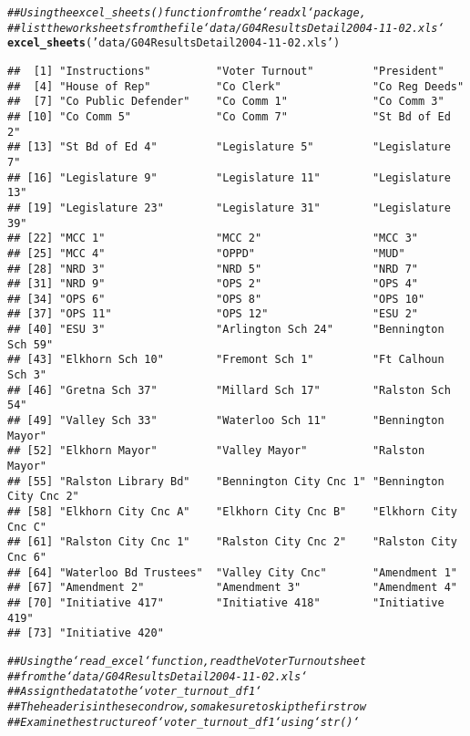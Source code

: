 \documentclass{article}\usepackage[]{graphicx}\usepackage[]{xcolor}
\makeatletter
\newcommand{\hlstr}[1]{\textcolor[rgb]{0.192,0.494,0.8}{#1}}%
\newcommand{\hlcom}[1]{\textcolor[rgb]{0.678,0.584,0.686}{\textit{#1}}}%
\newcommand{\hlstd}[1]{\textcolor[rgb]{0.345,0.345,0.345}{#1}}%
\newcommand{\hlkwd}[1]{\textcolor[rgb]{0.737,0.353,0.396}{\textbf{#1}}}%
\newenvironment{kframe}{%
 \def\at@end@of@kframe{}%
 \ifinner\ifhmode%
  \def\at@end@of@kframe{\end{minipage}}%
  \begin{minipage}{\columnwidth}%
 \fi\fi%
 \def\FrameCommand##1{\hskip\@totalleftmargin \hskip-\fboxsep
 \colorbox{shadecolor}{##1}\hskip-\fboxsep
     \hskip-\linewidth \hskip-\@totalleftmargin \hskip\columnwidth}%
 \MakeFramed {\advance\hsize-\width
   \@totalleftmargin\z@ \linewidth\hsize
   \@setminipage}}%
 {\par\unskip\endMakeFramed%
 \at@end@of@kframe}
\newenvironment{knitrout}{}{} %
\makeatother
\begin{document}
\begin{knitrout}
\begin{kframe}
\begin{alltt}
\hlcom{## Using the excel_sheets() function from the `readxl` package,}
\hlcom{## list the worksheets from the file `data/G04ResultsDetail2004-11-02.xls`}
\hlkwd{excel_sheets}\hlstd{(}\hlstr{'data/G04ResultsDetail2004-11-02.xls'}\hlstd{)}
\end{alltt}
\begin{verbatim}
##  [1] "Instructions"          "Voter Turnout"         "President"            
##  [4] "House of Rep"          "Co Clerk"              "Co Reg Deeds"         
##  [7] "Co Public Defender"    "Co Comm 1"             "Co Comm 3"            
## [10] "Co Comm 5"             "Co Comm 7"             "St Bd of Ed 2"        
## [13] "St Bd of Ed 4"         "Legislature 5"         "Legislature 7"        
## [16] "Legislature 9"         "Legislature 11"        "Legislature 13"       
## [19] "Legislature 23"        "Legislature 31"        "Legislature 39"       
## [22] "MCC 1"                 "MCC 2"                 "MCC 3"                
## [25] "MCC 4"                 "OPPD"                  "MUD"                  
## [28] "NRD 3"                 "NRD 5"                 "NRD 7"                
## [31] "NRD 9"                 "OPS 2"                 "OPS 4"                
## [34] "OPS 6"                 "OPS 8"                 "OPS 10"               
## [37] "OPS 11"                "OPS 12"                "ESU 2"                
## [40] "ESU 3"                 "Arlington Sch 24"      "Bennington Sch 59"    
## [43] "Elkhorn Sch 10"        "Fremont Sch 1"         "Ft Calhoun Sch 3"     
## [46] "Gretna Sch 37"         "Millard Sch 17"        "Ralston Sch 54"       
## [49] "Valley Sch 33"         "Waterloo Sch 11"       "Bennington Mayor"     
## [52] "Elkhorn Mayor"         "Valley Mayor"          "Ralston Mayor"        
## [55] "Ralston Library Bd"    "Bennington City Cnc 1" "Bennington City Cnc 2"
## [58] "Elkhorn City Cnc A"    "Elkhorn City Cnc B"    "Elkhorn City Cnc C"   
## [61] "Ralston City Cnc 1"    "Ralston City Cnc 2"    "Ralston City Cnc 6"   
## [64] "Waterloo Bd Trustees"  "Valley City Cnc"       "Amendment 1"          
## [67] "Amendment 2"           "Amendment 3"           "Amendment 4"          
## [70] "Initiative 417"        "Initiative 418"        "Initiative 419"       
## [73] "Initiative 420"
\end{verbatim}
\begin{alltt}
\hlcom{## Using the `read_excel` function, read the Voter Turnout sheet}
\hlcom{## from the `data/G04ResultsDetail2004-11-02.xls`}
\hlcom{## Assign the data to the `voter_turnout_df1`}
\hlcom{## The header is in the second row, so make sure to skip the first row}
\hlcom{## Examine the structure of `voter_turnout_df1` using `str()`}


\end{alltt}
\end{kframe}
\end{knitrout}
\end{document}

